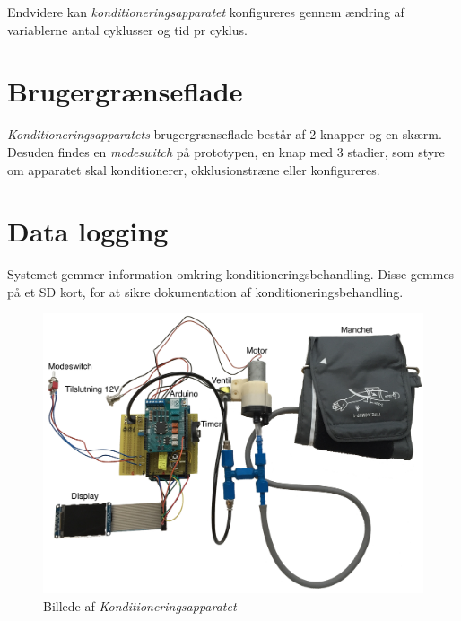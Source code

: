 Endvidere kan \textit{konditioneringsapparatet} konfigureres gennem ændring af variablerne antal cyklusser og tid pr cyklus.


\section{Brugergrænseflade}
\textit{Konditioneringsapparatets} brugergrænseflade består af 2 knapper og en skærm. Desuden findes en \textit{modeswitch} på prototypen, en knap med 3 stadier, som styre om apparatet skal konditionerer, okklusionstræne eller konfigureres.  

\section{Data logging}
Systemet gemmer information omkring konditioneringsbehandling. Disse gemmes på et SD kort, for at sikre dokumentation af konditioneringsbehandling.

\begin{figure}[H]
	\centering
	\includegraphics[width = \textwidth]{billeder/konditioneringsapparat-tekst.png}
	\caption{Billede af \textit{Konditioneringsapparatet}} \label{fig:oversigtsbillede}
\end{figure}